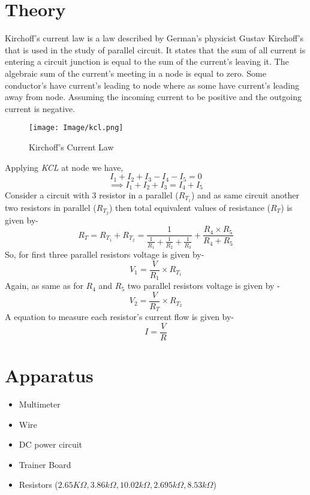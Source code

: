 \documentclass[a4paper,12pt]{article}
\begin{document}
 \section*{Theory}
Kirchoff's current law is a law described  by German's physicist Gustav Kirchoff's that is used in the study of parallel circuit. It states that the sum of all current is entering a circuit junction is equal to the sum of the current's leaving it. The algebraic sum of the current's meeting in a node is equal to zero. Some conductor's have current's leading to node where as some have current's leading away from node. Assuming the incoming current to be positive and the outgoing current is negative.
\begin{figure}[h]
\centering
 \texttt{[image: Image/kcl.png]}
\caption{Kirchoff's Current Law}
 \end{figure}

Applying \textit{KCL} at node we have,
\begin{equation*}
 I_1+I_2+I_3-I_4-I_5=0
 \end{equation*}
 \begin{equation*}
\implies I_1+I_2+I_3=I_4+I_5
\end{equation*}
Consider a circuit with $3$ resistor in a parallel ($R_{T_1}$) and as same circuit another two resistors in parallel ($R_{T_2}$) then total equivalent values of resistance ($R_T$) is given by-
\begin{equation}
 R_T=R_{T_1}+R_{T_2}=\frac{1}{\frac{1}{R_1}+\frac{1}{R_2}+\frac{1}{R_3}}+\frac{R_4\times R_5}{R_4+R_5}
\end{equation}
So, for first three parallel resistors voltage is given by-
\begin{equation}
 V_1=\frac{V}{R_1}\times R_{T_1}
\end{equation}
Again, as same as for $R_4$ and $R_5$ two parallel resistors voltage is given by -
\begin{equation}
 V_2=\frac{V}{R_T}\times R_{T_2}
\end{equation}
A equation to measure each resistor's current flow is given by-
\begin{equation}
 I=\frac{V}{R}
\end{equation}

\section*{Apparatus}
\begin{itemize}
 \item Multimeter
 \item Wire
 \item DC power circuit
 \item Trainer Board
 \item Resistors ($2.65 K\Omega, 3.86 k\Omega, 10.02k\Omega, 2.695 k\Omega, 8.53 k\Omega$)
\end{itemize}
\end{document}
